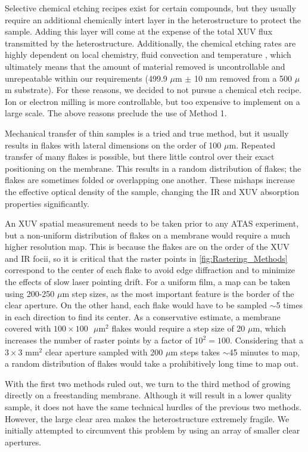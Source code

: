 Selective chemical etching recipes exist for certain compounds, but they usually require an additional chemically intert layer in the heterostructure to protect the sample. Adding this layer will come at the expense of the total XUV flux transmitted by the heterostructure. Additionally, the chemical etching rates are highly dependent on local chemistry, fluid convection and temperature \cite{chiuPhotoluminescenceEvolutionGaAs2015}, which ultimately means that the amount of material removed is uncontrollable and unrepeatable within our requirements (499.9 $\mu$m $\pm$ 10 nm removed from a 500 $\mu$m substrate). For these reasons, we decided to not pursue a chemical etch recipe. Ion or electron milling is more controllable, but too expensive to implement on a large scale. The above reasons preclude the use of Method 1.

Mechanical transfer of thin samples is a tried and true method, but it usually results in flakes with lateral dimensions on the order of 100 $\mu$m. Repeated transfer of many flakes is possible, but there little control over their exact positioning on the membrane. This results in a random distribution of flakes; the flakes are sometimes folded or overlapping one another. These mishaps increase the effective optical density of the sample, changing the IR and XUV absorption properties significantly.

An XUV spatial measurement needs to be taken prior to any ATAS experiment, but a non-uniform distribution of flakes on a membrane would require a much higher resolution map. This is because the flakes are on the order of the XUV and IR focii, so it is critical that the raster points in \cref{fig:Rastering_Methods} correspond to the center of each flake to avoid edge diffraction and to minimize the effects of slow laser pointing drift. For a uniform film, a map can be taken using 200-250 $\mu$m step sizes, as the most important feature is the border of the clear aperture. On the other hand, each flake would have to be sampled $\sim$5 times in each direction to find its center. As a conservative estimate, a membrane covered with $100 \times 100\text{ }\mu$m$^2$ flakes would require a step size of 20 $\mu$m, which increases the number of raster points by a factor of $10^2 = 100$. Considering that a $3 \times 3 \text{ mm}^2$ clear aperture sampled with 200 $\mu$m steps takes $\sim$45 minutes to map, a random distribution of flakes would take a prohibitively long time to map out.

With the first two methods ruled out, we turn to the third method of growing directly on a freestanding membrane. Although it will result in a lower quality sample, it does not have the same technical hurdles of the previous two methods. However, the large clear area makes the heterostructure extremely fragile. We initially attempted to circumvent this problem by using an array of smaller clear apertures.

